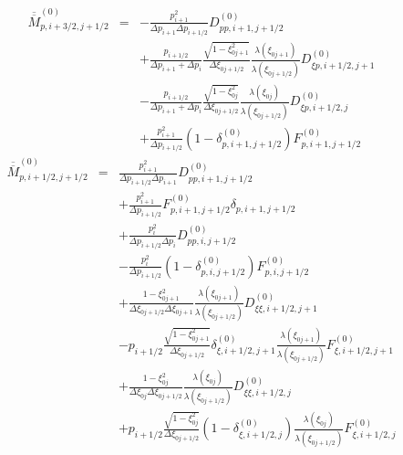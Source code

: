 \begin{eqnarray*}
\overline{\overline{M}}_{p,i+3/2,j+1/2}^{\left(0\right)} & = & -\frac{p_{i+1}^{2}}{\Delta p_{i+1}\Delta p_{i+1/2}}D_{pp,i+1,j+1/2}^{\left(0\right)}\\
 &  & +\frac{p_{i+1/2}}{\Delta p_{i+1}+\Delta p_{i}}\frac{\sqrt{1-\xi_{0j+1}^{2}}}{\Delta\xi_{0j+1/2}}\frac{\lambda\left(\xi_{0j+1}\right)}{\lambda\left(\xi_{0j+1/2}\right)}D_{\xi p,i+1/2,j+1}^{\left(0\right)}\\
 &  & -\frac{p_{i+1/2}}{\Delta p_{i+1}+\Delta p_{i}}\frac{\sqrt{1-\xi_{0j}^{2}}}{\Delta\xi_{0j+1/2}}\frac{\lambda\left(\xi_{0j}\right)}{\lambda\left(\xi_{0j+1/2}\right)}D_{\xi p,i+1/2,j}^{\left(0\right)}\\
 &  & +\frac{p_{i+1}^{2}}{\Delta p_{i+1/2}}\left(1-\delta_{p,i+1,j+1/2}^{\left(0\right)}\right)F_{p,i+1,j+1/2}^{\left(0\right)}\end{eqnarray*}
\begin{eqnarray*}
\overline{\overline{M}}_{p,i+1/2,j+1/2}^{\left(0\right)} & = & \frac{p_{i+1}^{2}}{\Delta p_{i+1/2}\Delta p_{i+1}}D_{pp,i+1,j+1/2}^{\left(0\right)}\\
 &  & +\frac{p_{i+1}^{2}}{\Delta p_{i+1/2}}F_{p,i+1,j+1/2}^{\left(0\right)}\delta_{p,i+1,j+1/2}\\
 &  & +\frac{p_{i}^{2}}{\Delta p_{i+1/2}\Delta p_{i}}D_{pp,i,j+1/2}^{\left(0\right)}\\
 &  & -\frac{p_{i}^{2}}{\Delta p_{i+1/2}}\left(1-\delta_{p,i,j+1/2}^{\left(0\right)}\right)F_{p,i,j+1/2}^{\left(0\right)}\\
 &  & +\frac{1-\xi_{0j+1}^{2}}{\Delta\xi_{0j+1/2}\Delta\xi_{0j+1}}\frac{\lambda\left(\xi_{0j+1}\right)}{\lambda\left(\xi_{0j+1/2}\right)}D_{\xi\xi,i+1/2,j+1}^{\left(0\right)}\\
 &  & -p_{i+1/2}\frac{\sqrt{1-\xi_{0j+1}^{2}}}{\Delta\xi_{0j+1/2}}\delta_{\xi,i+1/2,j+1}^{\left(0\right)}\frac{\lambda\left(\xi_{0j+1}\right)}{\lambda\left(\xi_{0j+1/2}\right)}F_{\xi,i+1/2,j+1}^{\left(0\right)}\\
 &  & +\frac{1-\xi_{0j}^{2}}{\Delta\xi_{0j}\Delta\xi_{0j+1/2}}\frac{\lambda\left(\xi_{0j}\right)}{\lambda\left(\xi_{0j+1/2}\right)}D_{\xi\xi,i+1/2,j}^{\left(0\right)}\\
 &  & +p_{i+1/2}\frac{\sqrt{1-\xi_{0j}^{2}}}{\Delta\xi_{0j+1/2}}\left(1-\delta_{\xi,i+1/2,j}^{\left(0\right)}\right)\frac{\lambda\left(\xi_{0j}\right)}{\lambda\left(\xi_{0j+1/2}\right)}F_{\xi,i+1/2,j}^{\left(0\right)}\end{eqnarray*}
